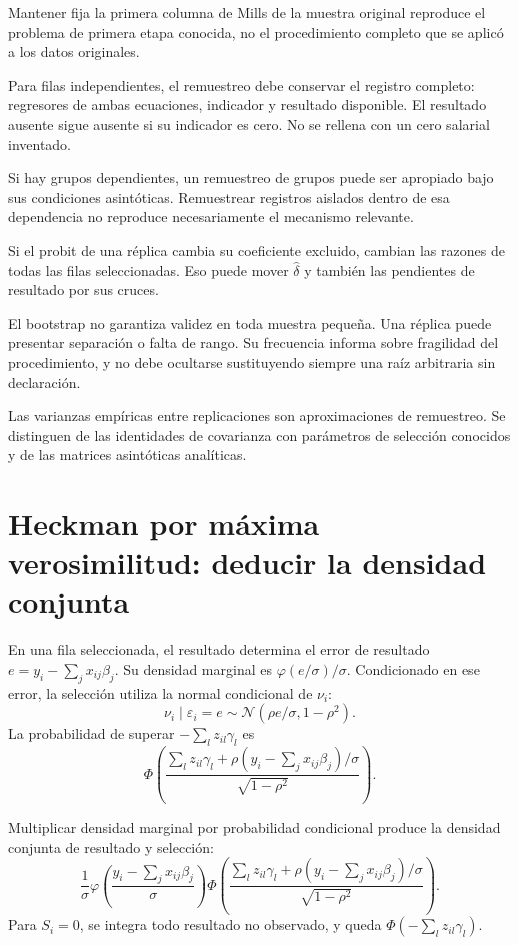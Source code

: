 \documentclass[11pt,a4paper]{article}
\begin{document}
Mantener fija la primera
columna de Mills de la
muestra original reproduce
el problema de primera etapa
conocida, no el procedimiento
completo que se aplicó
a los datos originales.

Para filas independientes,
el remuestreo debe conservar
el registro completo:
regresores de ambas ecuaciones,
indicador y resultado disponible.
El resultado ausente sigue
ausente si su indicador es cero.
No se rellena con un
cero salarial inventado.

Si hay grupos dependientes,
un remuestreo de grupos
puede ser apropiado bajo
sus condiciones asintóticas.
Remuestrear registros aislados
dentro de esa dependencia
no reproduce necesariamente
el mecanismo relevante.

\begin{ejemplo}
Si el probit de una réplica
cambia su coeficiente excluido,
cambian las razones de
todas las filas seleccionadas.
Eso puede mover \(\widehat\delta\)
y también las pendientes
de resultado por sus cruces.
\end{ejemplo}
El bootstrap no garantiza
validez en toda muestra pequeña.
Una réplica puede presentar
separación o falta de rango.
Su frecuencia informa sobre
fragilidad del procedimiento,
y no debe ocultarse
sustituyendo siempre una
raíz arbitraria sin declaración.

Las varianzas empíricas entre
replicaciones son aproximaciones
de remuestreo.
Se distinguen de las
identidades de covarianza
con parámetros de selección
conocidos y de las
matrices asintóticas analíticas.

\clearpage
\section{Heckman por máxima verosimilitud: deducir la densidad conjunta}\label{unidad141}
En una fila seleccionada, el resultado
determina el error de resultado
\(e=y_i-\sum_jx_{ij}\beta_j\).
Su densidad marginal es
\(\varphi(e/\sigma)/\sigma\).
Condicionado en ese error,
la selección utiliza la
normal condicional de \(\nu_i\):
\[
\nu_i\mid\varepsilon_i=e
\sim\mathcal N(\rho e/\sigma,1-\rho^2).
\]
La probabilidad de superar
\(-\sum_lz_{il}\gamma_l\)
es
\[
\Phi\left(
\frac{\sum_lz_{il}\gamma_l+
\rho(y_i-\sum_jx_{ij}\beta_j)/\sigma}
{\sqrt{1-\rho^2}}\right).
\]

Multiplicar densidad marginal por
probabilidad condicional produce
la densidad conjunta de
resultado y selección:
\[
\boxed{
\frac1\sigma
\varphi\left(\frac{y_i-\sum_jx_{ij}\beta_j}{\sigma}\right)
\Phi\left(
\frac{\sum_lz_{il}\gamma_l+
\rho(y_i-\sum_jx_{ij}\beta_j)/\sigma}
{\sqrt{1-\rho^2}}\right)}.
\]
Para \(S_i=0\), se integra
todo resultado no observado,
y queda
\(\Phi(-\sum_lz_{il}\gamma_l)\).
\end{document}
